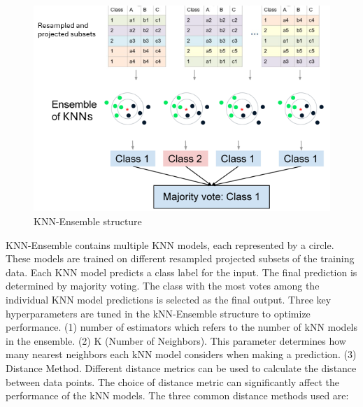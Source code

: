 \documentclass[a4paper]{article}
\begin{document}
\begin{figure}[ht]
    \centering
    \includegraphics[width=0.6\linewidth]{OFU-xAI-Proj-Template_v0.2/images/kNN-Ensemble.png}
    \caption{KNN-Ensemble structure}
    \label{fig:kNN-Ensemble}
\end{figure}

KNN-Ensemble contains multiple KNN models, each represented by a circle. These models are trained on different resampled projected subsets of the training data. Each KNN model predicts a class label for the input. The final prediction is determined by majority voting. The class with the most votes among the individual KNN model predictions is selected as the final output.
Three key hyperparameters are tuned in the kNN-Ensemble structure to optimize performance. (1) number of estimators which refers to the number of kNN models in the ensemble. (2) K (Number of Neighbors). This parameter determines how many nearest neighbors each kNN model considers when making a prediction. (3) Distance Method. Different distance metrics can be used to calculate the distance between data points. The choice of distance metric can significantly affect the performance of the kNN models. The three common distance methods used are:
\end{document}
